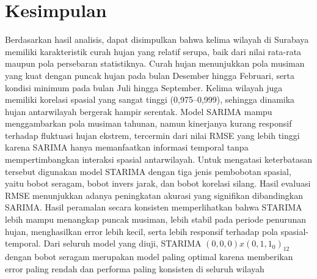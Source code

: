 \section{Kesimpulan}
Berdasarkan hasil analisis, dapat disimpulkan bahwa kelima wilayah di Surabaya memiliki karakteristik curah hujan yang relatif serupa, baik dari nilai rata-rata maupun pola persebaran statistiknya.
Curah hujan menunjukkan pola musiman yang kuat dengan puncak hujan pada bulan Desember hingga Februari, serta kondisi minimum pada bulan Juli hingga September.
Kelima wilayah juga memiliki korelasi spasial yang sangat tinggi (0,975–0,999), sehingga dinamika hujan antarwilayah bergerak hampir serentak.
Model SARIMA mampu menggambarkan pola musiman tahunan, namun kinerjanya kurang responsif terhadap fluktuasi hujan ekstrem, tercermin dari nilai RMSE yang lebih tinggi karena SARIMA hanya memanfaatkan informasi temporal tanpa mempertimbangkan interaksi spasial antarwilayah.
Untuk mengatasi keterbatasan tersebut digunakan model STARIMA dengan tiga jenis pembobotan spasial, yaitu bobot seragam, bobot invers jarak, dan bobot korelasi silang.
Hasil evaluasi RMSE menunjukkan adanya peningkatan akurasi yang signifikan dibandingkan SARIMA.
Hasil peramalan secara konsisten memperlihatkan bahwa STARIMA lebih mampu menangkap puncak musiman, lebih stabil pada periode penurunan hujan, menghasilkan error lebih kecil, serta lebih responsif terhadap pola spasial-temporal.
Dari seluruh model yang diuji, STARIMA $(0,0,0) x (0,1,1_{0})_{12}$ dengan bobot seragam merupakan model paling optimal karena memberikan error paling rendah dan performa paling konsisten di seluruh wilayah